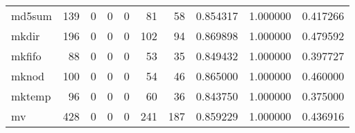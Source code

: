 \begin{longtable}{lrrrrrrrrr}
md5sum    &                                   139 &                                                  0 &                                                  0 &                                                  0 &                                                 81 &                                                 58 &                                           0.854317 &                               1.000000 &                             0.417266 \\
mkdir     &                                   196 &                                                  0 &                                                  0 &                                                  0 &                                                102 &                                                 94 &                                           0.869898 &                               1.000000 &                             0.479592 \\
mkfifo    &                                    88 &                                                  0 &                                                  0 &                                                  0 &                                                 53 &                                                 35 &                                           0.849432 &                               1.000000 &                             0.397727 \\
mknod     &                                   100 &                                                  0 &                                                  0 &                                                  0 &                                                 54 &                                                 46 &                                           0.865000 &                               1.000000 &                             0.460000 \\
mktemp    &                                    96 &                                                  0 &                                                  0 &                                                  0 &                                                 60 &                                                 36 &                                           0.843750 &                               1.000000 &                             0.375000 \\
mv        &                                   428 &                                                  0 &                                                  0 &                                                  0 &                                                241 &                                                187 &                                           0.859229 &                               1.000000 &                             0.436916 \\

\end{longtable}
